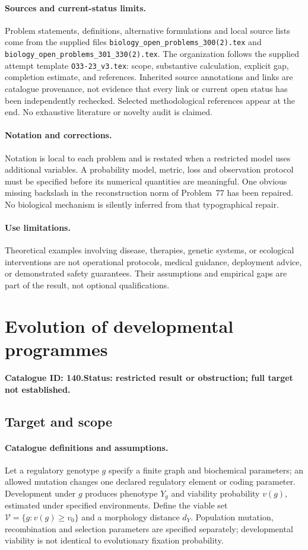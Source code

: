 \documentclass[11pt]{article}
\begin{document}
\paragraph{Sources and current-status limits.}
Problem statements, definitions, alternative formulations and local source lists
come from the supplied files
\texttt{biology\_open\_problems\_300(2).tex} and
\texttt{biology\_open\_problems\_301\_330(2).tex}.
The organization follows the supplied attempt template
\texttt{O33-23\_v3.tex}: scope, substantive calculation, explicit gap,
completion estimate, and references. Inherited source annotations and links are
catalogue provenance, not evidence that every link or current open status has
been independently rechecked. Selected methodological references appear at the
end. No exhaustive literature or novelty audit is claimed.

\paragraph{Notation and corrections.}
Notation is local to each problem and is restated when a restricted model uses
additional variables. A probability model, metric, loss and observation protocol
must be specified before its numerical quantities are meaningful. One obvious
missing backslash in the reconstruction norm of Problem~77 has been repaired.
No biological mechanism is silently inferred from that typographical repair.

\paragraph{Use limitations.}
Theoretical examples involving disease, therapies, genetic systems, or ecological
interventions are not operational protocols, medical guidance, deployment advice,
or demonstrated safety guarantees. Their assumptions and empirical gaps are part
of the result, not optional qualifications.

\setcounter{section}{139}
\section{Evolution of developmental programmes}
\label{prob:140}
\noindent\textbf{Catalogue ID: 140.}\quad \textbf{Status: restricted result or obstruction; full target not established.}
\subsection{Target and scope}
\paragraph{Catalogue definitions and assumptions.}
Let a regulatory genotype $g$ specify a finite graph and biochemical parameters; an allowed mutation changes one declared regulatory element or coding parameter. Development under $g$ produces phenotype $Y_g$ and viability probability $v(g)$, estimated under specified environments. Define the viable set $\mathcal V=\{g:v(g)\geq v_0\}$ and a morphology distance $d_Y$. Population mutation, recombination and selection parameters are specified separately; developmental viability is not identical to evolutionary fixation probability.
\end{document}
